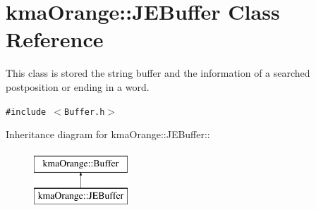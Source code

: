 \hypertarget{classkmaOrange_1_1JEBuffer}{
\section{kmaOrange::JEBuffer Class Reference}
\label{classkmaOrange_1_1JEBuffer}
}
This class is stored the string buffer and the information of a searched postposition or ending in a word.  


{\tt \#include $<$Buffer.h$>$}

Inheritance diagram for kmaOrange::JEBuffer::\begin{figure}[H]
\begin{center}
\leavevmode
\includegraphics[height=2cm]{classkmaOrange_1_1JEBuffer}
\end{center}
\end{figure}
